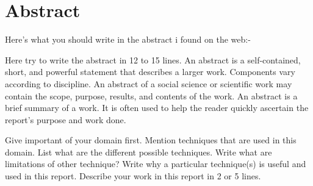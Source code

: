 \vspace{1in}
\chapter*{Abstract}

Here's what you should write in the abstract i found on the web:-


Here try to write the abstract in 12 to 15 lines. An abstract is a self-contained, short, and powerful statement that describes a larger work. Components vary according to discipline. An abstract of a social science or scientific work may contain the scope, purpose, results, and contents of the work. An abstract is a brief summary of a work. It is often used to help the reader quickly ascertain the report's purpose and work done. 

Give important of your domain first. Mention techniques that are used in this domain. List what are the different possible techniques. Write what are limitations of other technique? Write why a particular technique(s) is useful and used in this report. Describe your work in this report in 2 or 5 lines.
